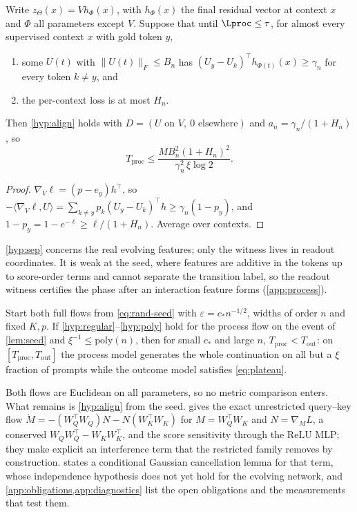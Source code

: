 \begin{proposition}\label{prop:separable}
Write $z_\Theta(x)=Vh_\Phi(x)$, with $h_\Phi(x)$ the final residual vector at context $x$ and $\Phi$ all parameters except $V$. Suppose that until $\Lproc\le\tau$, for almost every supervised context $x$ with gold token $y$,
\begin{enumerate}[label=(B\arabic*),ref=(B\arabic*),leftmargin=*,itemsep=1pt]
\item\label{hyp:sep} some $U(t)$ with $\|U(t)\|_F\le B_n$ has $(U_y-U_k)^\top h_{\Phi(t)}(x)\ge\gamma_n$ for every token $k\ne y$, and
\item\label{hyp:lossbd} the per-context loss is at most $H_n$.
\end{enumerate}
Then \ref{hyp:align} holds with $D=(U\text{ on }V,\ 0\text{ elsewhere})$ and $a_n=\gamma_n/(1+H_n)$, so
\begin{equation}\label{eq:sep-time}
T_{\mathrm{proc}}\le\frac{M B_n^2(1+H_n)^2}{\gamma_n^2\,\xi\log2}.
\end{equation}
\end{proposition}
\begin{proof}
$\nabla_V\ell=(p-e_y)h^\top$, so $-\langle\nabla_V\ell,U\rangle=\sum_{k\ne y}p_k(U_y-U_k)^\top h\ge\gamma_n(1-p_y)$, and $1-p_y=1-e^{-\ell}\ge\ell/(1+H_n)$. Average over contexts.
\end{proof}
\ref{hyp:sep} concerns the real evolving features; only the witness lives in readout coordinates. It is weak at the seed, where features are additive in the tokens up to score-order terms and cannot separate the transition label, so the readout witness certifies the phase after an interaction feature forms (\cref{app:process}).

\begin{corollary}\label{cor:separation}
Start both full flows from \cref{eq:rand-seed} with $\varepsilon=c_*n^{-1/2}$, widths of order $n$ and fixed $K,p$. If \ref{hyp:regular}--\ref{hyp:poly} hold for the process flow on the event of \cref{lem:seed} and $\xi^{-1}\le\mathrm{poly}(n)$, then for small $c_*$ and large $n$, $T_{\mathrm{proc}}<T_{\mathrm{out}}$: on $[T_{\mathrm{proc}},T_{\mathrm{out}}]$ the process model generates the whole continuation on all but a $\xi$ fraction of prompts while the outcome model satisfies \cref{eq:plateau}.
\end{corollary}
Both flows are Euclidean on all parameters, so no metric comparison enters. What remains is \ref{hyp:align} from the seed.  gives the exact unrestricted query--key flow $\dot M=-(W_Q^\top W_Q)N-N(W_K^\top W_K)$ for $M=W_Q^\top W_K$ and $N=\nabla_ML$, a conserved $W_QW_Q^\top-W_KW_K^\top$, and the score sensitivity through the ReLU MLP; they make explicit an interference term that the restricted family removes by construction.  states a conditional Gaussian cancellation lemma for that term, whose independence hypothesis does not yet hold for the evolving network, and \cref{app:obligations,app:diagnostics} list the open obligations and the measurements that test them.

